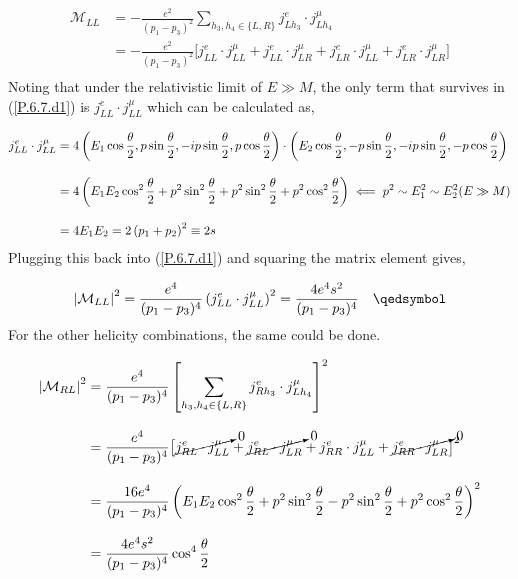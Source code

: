 \begin{solution}
\begin{enumerate}[label=(\alph*)]
            \begin{align}
                \mathcal{M}_{LL} &= -\frac{e^2}{(p_1-p_3)^2} \sum_{h_3,h_4 \in \{L,R\}} j^e_{Lh_3} \cdot j^\mu_{Lh_4} \nonumber \\[0.125in]  \label{P.6.7.d1}
                &=  -\frac{e^2}{(p_1-p_3)^2} \big[ j^e_{LL}\cdot j^\mu_{LL}+ j^e_{LL}\cdot j^\mu_{LR} + j^e_{LR}\cdot j^\mu_{LL} + j^e_{LR}\cdot j^\mu_{LR} \big] \\ \nonumber
            \end{align}
        Noting that under the relativistic limit of $E\gg M$, the only term that survives in (\ref{P.6.7.d1}) is $j^e_{LL}\cdot j^\mu_{LL}$ which can be calculated as,

            \begin{align*}
                j^e_{LL}\cdot j^\mu_{LL} &= 4 \left(E_1 \cos\frac{\theta}{2} , p \sin\frac{\theta}{2},-ip\sin\frac{\theta}{2} , p\cos\frac{\theta}{2} \right) \cdot \left( E_2 \cos\frac{\theta}{2} , -p \sin\frac{\theta}{2} , -ip\sin\frac{\theta}{2} , -p\cos\frac{\theta}{2} \right) \\[0.12in]
                &= 4\left(E_1E_2 \cos^2\frac{\theta}{2} +p^2\sin^2\frac{\theta}{2} + p^2 \sin^2\frac{\theta}{2} + p^2 \cos^2 \frac{\theta}{2} \right)  \impliedby p^2 \sim E_1^2 \sim E_2^2 (E\gg M)\\[0.12in]
                &= 4E_1E_2 = 2 \left(p_1+p_2\right)^2 \equiv 2s  \\ 
            \end{align*}
        Plugging this back into (\ref{P.6.7.d1}) and squaring the matrix element gives,

            \begin{align*}
                \left| \mathcal{M}_{LL} \right|^2 = \frac{e^4}{(p_1-p_3)^4} \left(j^e_{LL}\cdot j^\mu_{LL}\right)^2 =  \frac{4e^4s^2}{(p_1-p_3)^4} \qed \\
            \end{align*}
        For the other helicity combinations, the same could be done. 

            \begin{align*}
                \left|\mathcal{M}_{RL}\right|^2 &= \frac{e^4}{(p_1-p_3)^4}\left[ \sum_{h_3,h_4 \in \{L,R\}} j^e_{Rh_3} \cdot j^\mu_{Lh_4}\right]^2  \\[0.125in] 
                &=  \frac{e^4}{(p_1-p_3)^4} \big[\cancelto{0}{j^e_{RL}\cdot j^\mu_{LL}}+ \cancelto{0}{j^e_{RL}\cdot j^\mu_{LR} }+ j^e_{RR}\cdot j^\mu_{LL} + \cancelto{0}{j^e_{RR}\cdot j^\mu_{LR}} \big]^2 \\[0.125in]
                &= \frac{16e^4}{(p_1-p_3)^4} \left( E_1E_2\cos^2\frac{\theta}{2} + p^2 \sin^2\frac{\theta}{2} - p^2 \sin^2\frac{\theta}{2} + p^2 \cos^2\frac{\theta}{2} \right)^2 \\[0.125in]
                &= \frac{4e^4s^2}{(p_1-p_3)^4}  \cos^4\frac{\theta}{2} 
            \end{align*}


\end{enumerate}
\end{solution}
